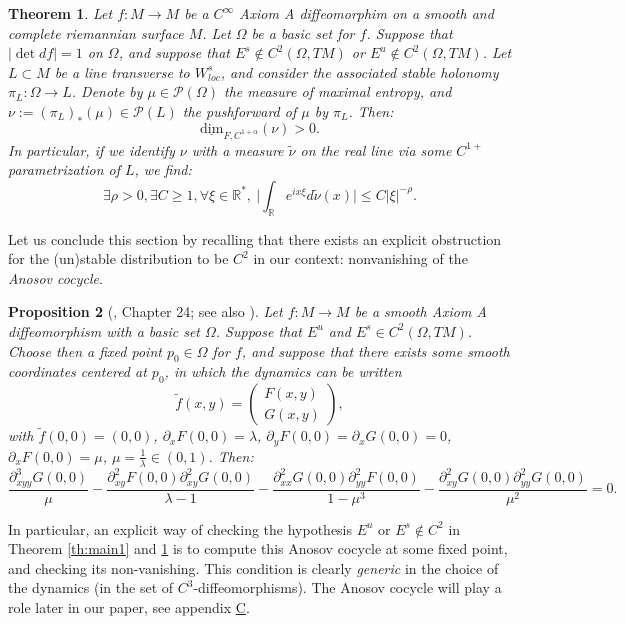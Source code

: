 \documentclass[a4paper]{article}
\newtheorem{theorem}{Theorem}[section]
\newtheorem{proposition}[theorem]{Proposition}
\theoremstyle{definition}
\begin{document}
\begin{theorem}\label{th:main2}
Let $f:M \rightarrow M$ be a $C^\infty$ Axiom A diffeomorphim on a smooth and complete riemannian surface $M$. Let $\Omega$ be a basic set for $f$. Suppose that $|\det df| = 1$ on $\Omega$, and suppose that $E^s \notin C^2(\Omega,TM)$ or $E^u \notin C^2(\Omega,TM)$. Let $L \subset M$ be a line transverse to $W^s_{loc}$, and consider the associated stable holonomy $\pi_L : \Omega \rightarrow L$. Denote by $\mu \in \mathcal{P}(\Omega)$ the measure of maximal entropy, and $\nu := (\pi_L)_*(\mu) \in \mathcal{P}(L)$ the pushforward of $\mu$ by $\pi_L$. Then:
$$ \underline{\text{dim}}_{F,C^{1+\alpha}}( \nu ) > 0.$$
In particular, if we identify $\nu$ with a measure $\tilde{\nu}$ on the real line via some $C^{1+}$ parametrization of $L$, we find:
$$ \exists \rho >0, \exists C \geq 1, \forall \xi \in \mathbb{R}^*, \ \Big| \int_\mathbb{R} e^{i x \xi} d\tilde{\nu}(x) \Big| \leq C |\xi|^{-\rho}. $$
\end{theorem}

Let us conclude this section by recalling that there exists an explicit obstruction for the (un)stable distribution to be $C^2$ in our context: nonvanishing of the \emph{Anosov cocycle}. 

\begin{proposition}[\cite{An67}, Chapter 24; see also \cite{HK90}]\label{prop:Acocycle}
    Let $f:M\rightarrow M$ be a smooth Axiom A diffeomorphism with a basic set $\Omega$. Suppose that $E^u$ and $E^s \in C^2(\Omega,TM)$. Choose then a fixed point $p_0 \in \Omega$ for $f$, and suppose that there exists some smooth  coordinates centered at $p_0$, in which the dynamics can be written $$ \tilde{f}(x,y) = \begin{pmatrix} F(x,y) \\ G(x,y) \end{pmatrix}, $$
    with $\tilde{f}(0,0)=(0,0)$, $\partial_x F(0,0) = \lambda$, $\partial_y F(0,0) = \partial_x G(0,0)=0$, $\partial_x F(0,0) = \mu$, $\mu = \frac{1}{\lambda} \in (0,1)$. Then:
    $$ \frac{\partial^3_{xyy} G(0,0)}{\mu} - \frac{\partial_{xy}^2 F(0,0) \partial_{xy}^2 G(0,0)}{\lambda-1} - \frac{\partial_{xx}^2 G(0,0) \partial_{yy}^2 F(0,0)}{1-\mu^3} - \frac{\partial_{xy}^2 G(0,0) \partial_{yy}^2 G(0,0)}{\mu^2} = 0. $$
\end{proposition}

In particular, an explicit way of checking the hypothesis $E^u \text{ or }E^s \notin C^2$ in Theorem \ref{th:main1} and \ref{th:main2} is to compute this Anosov cocycle at some fixed point, and checking its non-vanishing. This condition is clearly \emph{generic} in the choice of the dynamics (in the set of $C^{3}$-diffeomorphisms). The Anosov cocycle will play a role later in our paper, see appendix \hyperref[ap:C]{C}.
\end{document}
